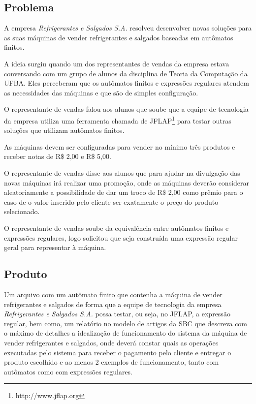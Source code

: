\subsection{Problema}

A empresa \textit{Refrigerantes e Salgados S.A.} resolveu desenvolver novas soluções
para as suas máquinas de vender refrigerantes e salgados
baseadas em autômatos finitos.

A ideia surgiu quando um dos representantes de vendas da empresa estava conversando
com um grupo de alunos da disciplina de Teoria da Computação da UFBA.
Eles perceberam que os autômatos finitos e expressões regulares
atendem as necessidades das máquinas e que são
de simples configuração.



O representante de vendas falou aos alunos que soube que a equipe de tecnologia
da empresa utiliza uma ferramenta chamada de JFLAP\footnote{http://www.jflap.org}
para testar outras soluções que utilizam autômatos finitos.

As máquinas devem ser configuradas para vender no mínimo três produtos e
receber notas de R\$ 2,00 e R\$ 5,00.

O representante de vendas disse aos alunos que para ajudar na divulgação
das novas máquinas irá realizar uma promoção, onde as máquinas deverão
considerar aleatoriamente a possibilidade de dar um troco de R\$ 2,00
como prêmio para o caso de o valor inserido pelo cliente ser exatamente
o preço do produto selecionado.

O representante de vendas soube da equivalência entre autômatos finitos
e expressões regulares, logo solicitou que seja construída uma expressão
regular geral para representar à máquina.

\subsection{Produto}
Um arquivo com um autômato finito que contenha a máquina de vender
refrigerantes e salgados de forma que a equipe de tecnologia da
empresa \textit{Refrigerantes e Salgados S.A.} possa testar, ou seja, no JFLAP,
a expressão regular, bem como, um relatório no modelo de
artigos da SBC que descreva com o máximo de detalhes a idealização de funcionamento do
sistema da máquina de vender refrigerantes e salgados, onde deverá
constar quais as operações executadas pelo sistema para receber o pagamento pelo cliente e entregar o
produto escolhido e ao menos 2 exemplos de funcionamento, tanto com autômatos
como com expressões regulares.
